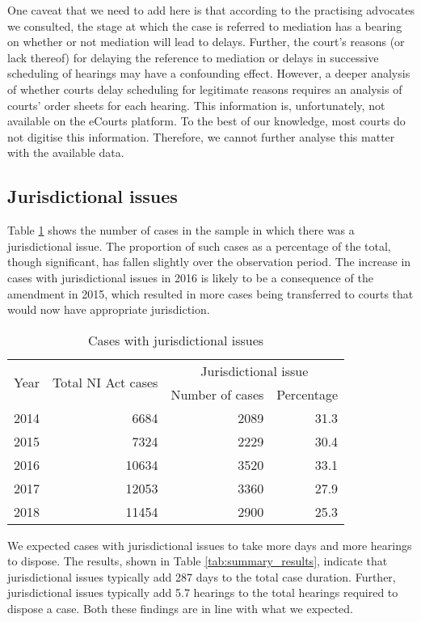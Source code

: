 One caveat that we need to add here is that according to the practising advocates we consulted, the stage at which the case is referred to mediation has a bearing on whether or not mediation will lead to delays. Further, the court's reasons (or lack thereof) for delaying the reference to mediation or delays in successive scheduling of hearings may have a confounding effect. However, a deeper analysis of whether courts delay scheduling for legitimate reasons requires an analysis of courts' order sheets for each hearing. This information is, unfortunately, not available on the eCourts platform. To the best of our knowledge, most courts do not digitise this information. Therefore, we cannot further analyse this matter with the available data.

\subsection{Jurisdictional issues}
\label{sec:jurisd-issu}

Table \ref{tab:jurisdiction_yearWise} shows the number of cases in the sample in which there was a jurisdictional issue. The proportion of such cases as a percentage of the total, though significant, has fallen slightly over the observation period. The increase in cases with jurisdictional issues in 2016 is likely to be a consequence of the amendment in 2015, which resulted in more cases being transferred to courts that would now have appropriate jurisdiction.

\begin{longtable}[h!]{@{}lrrr@{}}
 \caption{Cases with jurisdictional issues}\label{tab:jurisdiction_yearWise}\\
\toprule
\multirow{2}{*}{Year} &  \multirow{2}{*}{Total NI Act cases} & \multicolumn{2}{c}{Jurisdictional issue}\\
\cmidrule{3-4}
&& Number of cases & Percentage \\
\midrule\endhead
2014 & 6684 & 2089 & 31.3 \\
2015 & 7324 & 2229 & 30.4 \\
2016 & 10634 & 3520 & 33.1 \\
2017 & 12053 & 3360 & 27.9 \\
2018 & 11454 & 2900 & 25.3 \\
\bottomrule
\end{longtable}

We expected cases with jurisdictional issues to take more days and more hearings to dispose. The results, shown in Table \ref{tab:summary_results}, indicate that jurisdictional issues typically add 287 days to the total case duration. Further, jurisdictional issues typically add 5.7 hearings to the total hearings required to dispose a case. Both these findings are in line with what we expected.

